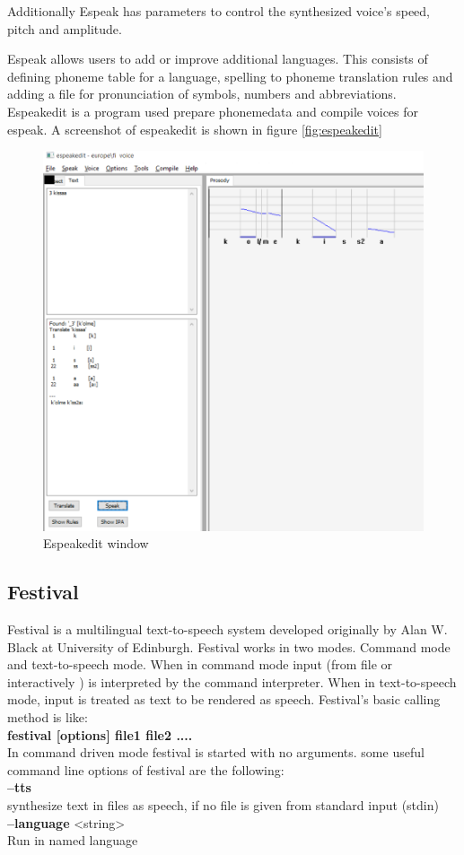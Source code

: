 \documentclass[11pt,a4paper,oneside,article]{memoir}
\begin{document}
Additionally Espeak has parameters to control the synthesized voice's speed, pitch and amplitude.

Espeak allows users to add or improve additional languages. This consists of defining phoneme table for a language, spelling to phoneme translation rules and adding a file for pronunciation of symbols, numbers and abbreviations. Espeakedit is a program used prepare phonemedata and compile voices for espeak. A screenshot of espeakedit is shown in figure \vref{fig:espeakedit}

\begin{figure}[h]
  \includegraphics[width=15cm]{espeakedit}
  \caption{Espeakedit window}
  \label{fig:espeakedit}
\end{figure}

\subsection{Festival}
Festival is a multilingual text-to-speech system developed originally by Alan W. Black at University of Edinburgh. Festival works in two modes. Command mode and text-to-speech mode. When in command mode input (from file or interactively ) is interpreted by the command interpreter. When in text-to-speech mode, input is treated as text to be rendered as speech.
Festival's basic calling method is like:\\
\textbf{festival [options] file1 file2 ....}\\
In command driven mode festival is started with no arguments.
some useful command line options of festival are the following:\\
\textbf{--tts}\\
synthesize text in files as speech, if no file is given from standard input (stdin)\\
\textbf{--language} <string>\\
Run in named language
\end{document}
